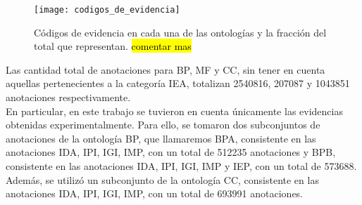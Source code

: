 \begin{figure}[h]
    \centering
    \texttt{[image: codigos\_de\_evidencia]}
    \caption{Códigos de evidencia en cada una de las ontologías y la fracción del total que representan. \hl{comentar mas}}
    \label{fig:codigos_de_evidencia}
\end{figure}
Las cantidad total de anotaciones para BP, MF y CC, sin tener en cuenta aquellas pertenecientes a la categoría IEA, totalizan 2540816, 207087 y 1043851 anotaciones respectivamente.\\
En particular, en este trabajo se tuvieron en cuenta únicamente las evidencias obtenidas experimentalmente. Para ello, se tomaron dos subconjuntos de anotaciones de la ontología BP, que llamaremos BPA, consistente en las anotaciones IDA, IPI, IGI, IMP, con un total de 512235 anotaciones y BPB, consistente en las anotaciones IDA, IPI, IGI, IMP y IEP, con un total de 573688. Además, se utilizó un subconjunto de la ontología CC, consistente en las anotaciones IDA, IPI, IGI, IMP, con un total de 693991 anotaciones.\cite{Pandey2008} \cite{Resnik1995} \cite{Bose2016} \cite{Pesquita2009} \cite{Berenstein2014} \cite{Ashburner}

